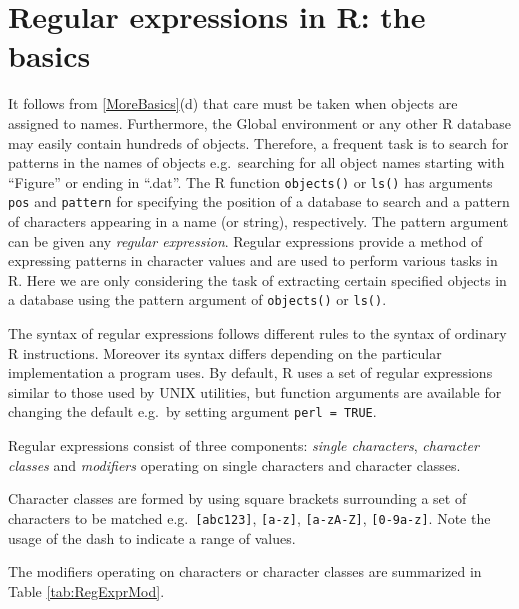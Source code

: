\documentclass[
]{book}
\begin{document}
\section{Regular expressions in R: the basics}\label{regular-expressions-in-r-the-basics}

It follows from \ref{MoreBasics}(d) that care must be taken when objects are assigned to names. Furthermore, the Global environment or any other R database may easily contain hundreds of objects. Therefore, a frequent task is to search for patterns in the names of objects e.g.~searching for all object names starting with ``Figure'' or ending in ``.dat''. The R function \texttt{objects()} or \texttt{ls()} has arguments \texttt{pos} and \texttt{pattern} for specifying the position of a database to search and a pattern of characters appearing in a name (or string), respectively. The pattern argument can be given any \emph{{regular expression}}. Regular expressions provide a method of expressing patterns in character values and are used to perform various tasks in R. Here we are only considering the task of extracting certain specified objects in a database using the pattern argument of \texttt{objects()} or \texttt{ls()}.

The syntax of regular expressions follows different rules to the syntax of ordinary R instructions. Moreover its syntax differs depending on the particular implementation a program uses. By default, R uses a set of regular expressions similar to those used by UNIX utilities, but function arguments are available for changing the default e.g.~by setting argument \texttt{perl\ =\ TRUE}.

Regular expressions consist of three components: \emph{{single characters}}, \emph{{character classes}} and \emph{{modifiers}} operating on single characters and character classes.

Character classes are formed by using square brackets surrounding a set of characters to be matched e.g.~\texttt{{[}abc123{]}}, \texttt{{[}a-z{]}}, \texttt{{[}a-zA-Z{]}}, \texttt{{[}0-9a-z{]}}. Note the usage of the dash to indicate a range of values.

The modifiers operating on characters or character classes are summarized in Table \ref{tab:RegExprMod}.
\end{document}
